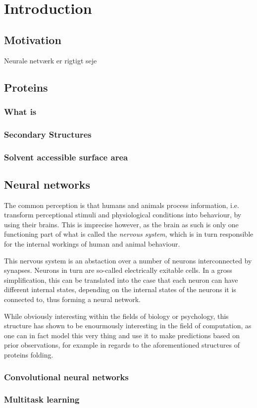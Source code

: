 \section{Introduction}
\subsection{Motivation}
Neurale netværk er rigtigt seje \cite{bishop2006}
\subsection{Proteins}
\subsubsection{What is}
\subsubsection{Secondary Structures}
\subsubsection{Solvent accessible surface area}
\subsection{Neural networks}
The common perception is that humans and animals process information, i.e. transform perceptional stimuli and physiological conditions into behaviour, by using their brains. This is imprecise however, as the brain as such is only one functioning part of what is called the \textit{nervous system}, which is in turn responsible for the internal workings of human and animal behaviour.

This nervous system is an abstaction over a number of neurons interconnected by synapses. Neurons in turn are so-called electrically exitable cells. In a gross simplification, this can be translated into the case that each neuron can have different internal states, depending on the internal states of the neurons it is connected to, thus forming a neural network.

While obviously interesting within the fields of biology or psychology, this structure has shown to be enourmously interesting in the field of computation, as one can in fact model this very thing and use it to make predictions based on prior observations, for example in regards to the aforementioned structures of proteins folding.

\subsubsection{Convolutional neural networks}
\subsubsection{Multitask learning}